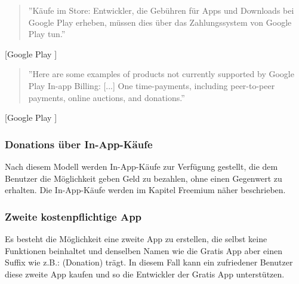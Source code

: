 \documentclass[FIPLY_base.tex]{subfiles}
\begin{document}
\begin{quote}
''Käufe im Store: Entwickler, die Gebühren für Apps und Downloads bei Google Play erheben, müssen dies über das Zahlungssystem von Google Play tun.''
\end{quote}[Google Play \cite{gpDevContentPolicy}]

\begin{quote}
''Here are some examples of products not currently supported by Google Play In-app Billing: [...]
One time-payments, including peer-to-peer payments, online auctions, and donations.''
\end{quote}[Google Play \cite{gpInAppBilling}]
\ \\
\subsubsection{Donations über In-App-Käufe}
Nach diesem Modell werden In-App-Käufe zur Verfügung gestellt, die dem Benutzer die Möglichkeit geben Geld zu bezahlen, ohne einen Gegenwert zu erhalten. 
Die In-App-Käufe werden im Kapitel Freemium näher beschrieben.
\ \\
\subsubsection{Zweite kostenpflichtige App}
Es besteht die Möglichkeit eine zweite App zu erstellen, die selbst keine Funktionen beinhaltet und denselben Namen wie die Gratis App aber einen Suffix wie z.B.: (Donation) trägt.
In diesem Fall kann ein zufriedener Benutzer diese zweite App kaufen und so die Entwickler der Gratis App unterstützen.
\end{document}
